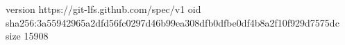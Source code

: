 version https://git-lfs.github.com/spec/v1
oid sha256:3a55942965a2dfd56fc0297d46b99ea308dfb0dfbe0df4b8a2f10f929d7575dc
size 15908

